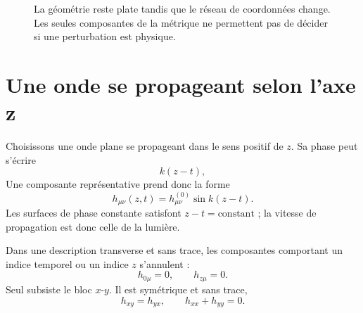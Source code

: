 \begin{figure}[htbp]
\centering
{}
\caption{La géométrie reste plate tandis que le réseau de coordonnées change. Les seules composantes de la métrique ne permettent pas de décider si une perturbation est physique.}
\end{figure}

\section{Une onde se propageant selon l’axe z}

Choisissons une onde plane se propageant dans le sens positif de \(z\). Sa phase peut s’écrire
\begin{equation}
 k(z-t),
\end{equation}
Une composante représentative prend donc la forme
\begin{equation}
 h_{\mu\nu}(z,t)
 =h_{\mu\nu}^{(0)}\sin k(z-t).
 \label{eq:plane-wave}
\end{equation}
Les surfaces de phase constante satisfont \(z-t=\text{constant}\) ; la vitesse de propagation est donc celle de la lumière.

Dans une description transverse et sans trace, les composantes comportant un indice temporel ou un indice \(z\) s’annulent :
\begin{equation}
 h_{0\mu}=0,
 \qquad
 h_{z\mu}=0.
 \label{eq:tt-transverse}
\end{equation}
Seul subsiste le bloc \(x\)-\(y\). Il est symétrique et sans trace,
\begin{equation}
 h_{xy}=h_{yx},
 \qquad
 h_{xx}+h_{yy}=0.
 \label{eq:tt-trace}
\end{equation}

